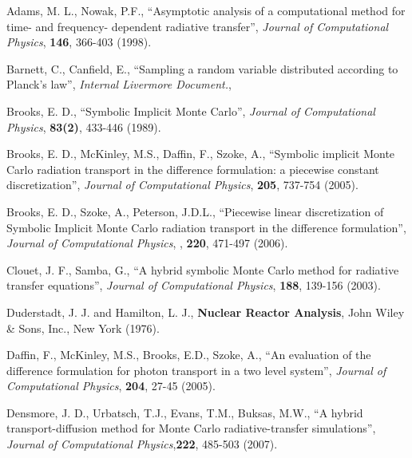 

\begin{thebibliography}{Wac 75}

\vskip0.1in

 Adams, M. L., Nowak, P.F.,
	``Asymptotic analysis of a computational method for time- and frequency- dependent radiative transfer'', 
	\emph{Journal of Computational Physics},
	\textbf{146}, 366-403 (1998).

 Barnett, C., Canfield, E., ``Sampling a random variable distributed according to Planck's law'', \emph{Internal Livermore Document.},

  Brooks, E. D., ``Symbolic Implicit Monte Carlo'', 
	\emph{Journal of Computational Physics}, 
	\textbf{83(2)}, 433-446 (1989).

 Brooks, E. D., McKinley, M.S., Daffin, F., Szoke, A., ``Symbolic implicit Monte Carlo radiation transport in the difference formulation: a piecewise constant discretization'', \emph{Journal of Computational Physics}, \textbf{205},
	737-754 (2005).

 Brooks, E. D., Szoke, A., Peterson, J.D.L., ``Piecewise linear discretization of Symbolic Implicit Monte Carlo radiation transport in the difference formulation'', \emph{Journal of Computational Physics}, , \textbf{220},
	471-497 (2006).
	
 Clouet, J. F., Samba, G., ``A hybrid symbolic Monte Carlo method for radiative transfer equations'', \emph{Journal of Computational Physics}, \textbf{188},
	139-156 (2003).

 Duderstadt, J. J. and Hamilton, L. J., \textbf{Nuclear Reactor Analysis}, John Wiley \& Sons, Inc., New York (1976).


 Daffin, F., McKinley, M.S., Brooks, E.D., Szoke, A., ``An evaluation of the difference formulation for photon transport in a two level system'', 
	\emph{Journal of Computational Physics},
	\textbf{204},  27-45 (2005).
	
 Densmore, J. D., Urbatsch, T.J., Evans, T.M., Buksas, M.W., ``A hybrid transport-diffusion method for Monte Carlo radiative-transfer simulations'', 
	\emph{Journal of Computational Physics},\textbf{222}, 485-503 (2007).


\end{thebibliography}
